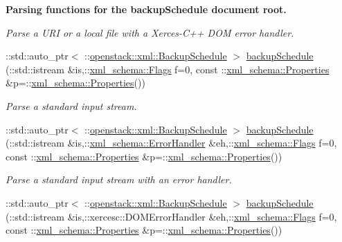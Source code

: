 \begin{Indent}{\bf Parsing functions for the backupSchedule document root.}
\begin{DoxyCompactItemize}
\begin{DoxyCompactList}\small\item\em Parse a URI or a local file with a Xerces-\/C++ DOM error handler. \item\end{DoxyCompactList}\item 
::std::auto\_\-ptr$<$ ::\hyperlink{classopenstack_1_1xml_1_1BackupSchedule}{openstack::xml::BackupSchedule} $>$ \hyperlink{namespaceopenstack_1_1xml_a2227b096be45abda23ec4d87be8859d9}{backupSchedule} (::std::istream \&is,::\hyperlink{namespacexml__schema_affb4c227cbd9aa7453dd1dc5a1401943}{xml\_\-schema::Flags} f=0, const ::\hyperlink{namespacexml__schema_ad27ce19a7ee1d3b1064092648898f64c}{xml\_\-schema::Properties} \&p=::\hyperlink{namespacexml__schema_ad27ce19a7ee1d3b1064092648898f64c}{xml\_\-schema::Properties}())
\begin{DoxyCompactList}\small\item\em Parse a standard input stream. \item\end{DoxyCompactList}\item 
::std::auto\_\-ptr$<$ ::\hyperlink{classopenstack_1_1xml_1_1BackupSchedule}{openstack::xml::BackupSchedule} $>$ \hyperlink{namespaceopenstack_1_1xml_a4a917e9c03a865f2e40fb56eee4401c1}{backupSchedule} (::std::istream \&is,::\hyperlink{namespacexml__schema_ab1c9361bfd3b404eaabf0c31eded79dc}{xml\_\-schema::ErrorHandler} \&eh,::\hyperlink{namespacexml__schema_affb4c227cbd9aa7453dd1dc5a1401943}{xml\_\-schema::Flags} f=0, const ::\hyperlink{namespacexml__schema_ad27ce19a7ee1d3b1064092648898f64c}{xml\_\-schema::Properties} \&p=::\hyperlink{namespacexml__schema_ad27ce19a7ee1d3b1064092648898f64c}{xml\_\-schema::Properties}())
\begin{DoxyCompactList}\small\item\em Parse a standard input stream with an error handler. \item\end{DoxyCompactList}\item 
::std::auto\_\-ptr$<$ ::\hyperlink{classopenstack_1_1xml_1_1BackupSchedule}{openstack::xml::BackupSchedule} $>$ \hyperlink{namespaceopenstack_1_1xml_a53f31cea8addbe0262170e58492f159d}{backupSchedule} (::std::istream \&is,::xercesc::DOMErrorHandler \&eh,::\hyperlink{namespacexml__schema_affb4c227cbd9aa7453dd1dc5a1401943}{xml\_\-schema::Flags} f=0, const ::\hyperlink{namespacexml__schema_ad27ce19a7ee1d3b1064092648898f64c}{xml\_\-schema::Properties} \&p=::\hyperlink{namespacexml__schema_ad27ce19a7ee1d3b1064092648898f64c}{xml\_\-schema::Properties}())

\end{DoxyCompactItemize}
\end{Indent}
